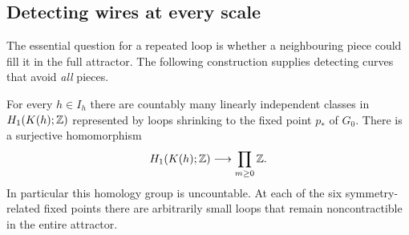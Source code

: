 \subsection{Detecting wires at every scale}
The essential question for a repeated loop is whether a neighbouring piece
could fill it in the full attractor. The following construction supplies
detecting curves that avoid \emph{all} pieces.

\begin{theorem}\label{thm:homology}
For every $h\in I_h$ there are countably many linearly independent classes
in $H_1(K(h);\mathbb Z)$ represented by loops shrinking to the fixed point $p_*$
of $G_0$. There is a surjective homomorphism
\begin{equation}\label{eq:product}
H_1(K(h);\mathbb Z)\longrightarrow\prod_{m\ge0}\mathbb Z.
\end{equation}
In particular this homology group is uncountable. At each of the six
symmetry-related fixed points there are arbitrarily small loops that remain
noncontractible in the entire attractor.
\end{theorem}

